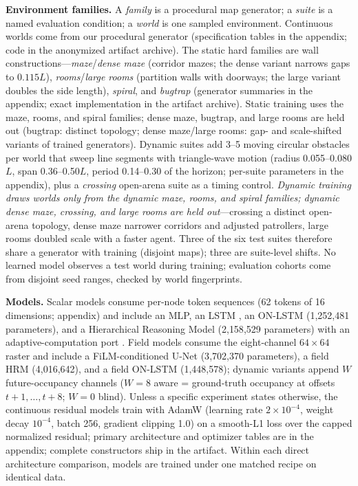 \documentclass[letterpaper]{article} %
\begin{document}
\textbf{Environment families.} A \emph{family} is a procedural map generator; a \emph{suite} is a named evaluation condition; a \emph{world} is one sampled environment. Continuous worlds come from our procedural generator (specification tables in the appendix; code in the anonymized artifact archive). The static hard families are wall constructions---\emph{maze}/\emph{dense maze} (corridor mazes; the dense variant narrows gaps to $0.115L$), \emph{rooms}/\emph{large rooms} (partition walls with doorways; the large variant doubles the side length), \emph{spiral}, and \emph{bugtrap} (generator summaries in the appendix; exact implementation in the artifact archive). Static training uses the maze, rooms, and spiral families; dense maze, bugtrap, and large rooms are held out (bugtrap: distinct topology; dense maze/large rooms: gap- and scale-shifted variants of trained generators). Dynamic suites add 3--5 moving circular obstacles per world that sweep line segments with triangle-wave motion (radius 0.055--0.080$L$, span 0.36--0.50$L$, period 0.14--0.30 of the horizon; per-suite parameters in the appendix), plus a \emph{crossing} open-arena suite as a timing control. \emph{Dynamic training draws worlds only from the dynamic maze, rooms, and spiral families; dynamic dense maze, crossing, and large rooms are held out}---crossing a distinct open-arena topology, dense maze narrower corridors and adjusted patrollers, large rooms doubled scale with a faster agent. Three of the six test suites therefore share a generator with training (disjoint maps); three are suite-level shifts. No learned model observes a test world during training; evaluation cohorts come from disjoint seed ranges, checked by world fingerprints.

\textbf{Models.} Scalar models consume per-node token sequences (62 tokens of 16 dimensions; appendix) and include an MLP, an LSTM \citep{hochreiter1997lstm}, an ON-LSTM \citep{shen2019onlstm} (1{,}252{,}481 parameters), and a Hierarchical Reasoning Model \citep[HRM;][]{wang2025hrm} (2{,}158{,}529 parameters) with an adaptive-computation port \citep{graves2016act,banino2021pondernet}. Field models consume the eight-channel $64{\times}64$ raster and include a FiLM-conditioned U-Net \citep{ronneberger2015unet,perez2018film} (3{,}702{,}370 parameters), a field HRM (4{,}016{,}642), and a field ON-LSTM (1{,}448{,}578); dynamic variants append $W$ future-occupancy channels ($W{=}8$ aware = ground-truth occupancy at offsets $t{+}1,\ldots,t{+}8$; $W{=}0$ blind). Unless a specific experiment states otherwise, the continuous residual models train with AdamW (learning rate $2{\times}10^{-4}$, weight decay $10^{-4}$, batch 256, gradient clipping 1.0) on a smooth-L1 loss over the capped normalized residual; primary architecture and optimizer tables are in the appendix; complete constructors ship in the artifact. Within each direct architecture comparison, models are trained under one matched recipe on identical data.
\end{document}
